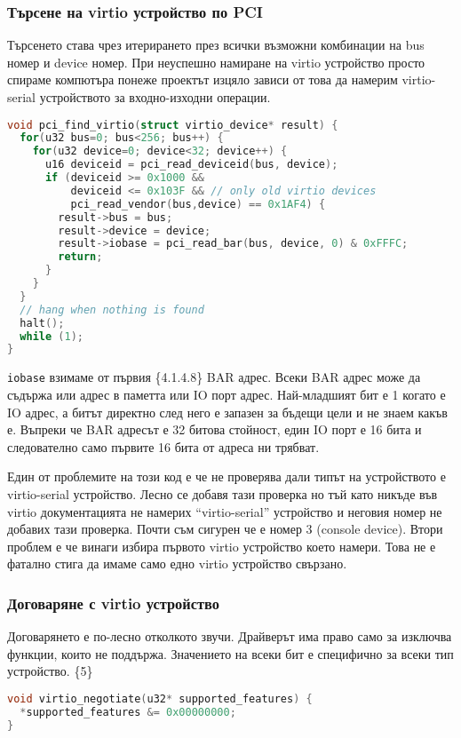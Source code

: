 \subsubsection{Търсене на virtio устройство по PCI}
Търсенето става чрез итерирането през всички възможни комбинации на bus номер и device номер. При неуспешно намиране на virtio устройство просто спираме компютъра понеже проектът изцяло зависи от това да намерим virtio-serial устройството за входно-изходни операции.
\begin{lstlisting}[language=C]
void pci_find_virtio(struct virtio_device* result) {
  for(u32 bus=0; bus<256; bus++) {
    for(u32 device=0; device<32; device++) {
      u16 deviceid = pci_read_deviceid(bus, device);
      if (deviceid >= 0x1000 &&
          deviceid <= 0x103F && // only old virtio devices
          pci_read_vendor(bus,device) == 0x1AF4) {
        result->bus = bus;
        result->device = device;
        result->iobase = pci_read_bar(bus, device, 0) & 0xFFFC;
        return;
      }
    }
  }
  // hang when nothing is found
  halt();
  while (1);
}
\end{lstlisting}
{\tt iobase} взимаме от първия \{4.1.4.8\} BAR адрес. Всеки BAR адрес може да съдържа или адрес в паметта или IO порт адрес. Най-младшият бит е 1 когато е IO адрес, а битът директно след него е запазен за бъдещи цели и не знаем какъв е. Въпреки че BAR адресът е 32 битова стойност, един IO порт е 16 бита и следователно само първите 16 бита от адреса ни трябват.

Един от проблемите на този код е че не проверява дали типът на устройството е virtio-serial устройство. Лесно се добавя тази проверка но тъй като никъде във virtio документацията не намерих ``virtio-serial'' устройство и неговия номер не добавих тази проверка. Почти съм сигурен че е номер 3 (console device).
Втори проблем е че винаги избира първото virtio устройство което намери. Това не е фатално стига да имаме само едно virtio устройство свързано.

\subsubsection{Договаряне с virtio устройство}
Договарянето е по-лесно отколкото звучи. Драйверът има право само за изключва функции, които не поддържа. Значението на всеки бит е специфично за всеки тип устройство. \{5\}
\begin{lstlisting}[language=C]
void virtio_negotiate(u32* supported_features) {
  *supported_features &= 0x00000000;
}
\end{lstlisting}

